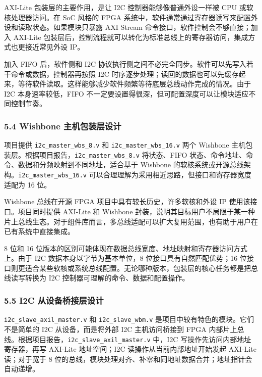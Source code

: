 AXI-Lite 包装层的主要作用，是让 I2C 控制器能够像普通外设一样被 CPU 或软核处理器访问。在 SoC 风格的 FPGA 系统中，软件通常通过寄存器读写来配置外设和读取状态。如果模块只暴露 AXI Stream 命令接口，软件控制会不够直接；加入 AXI-Lite 包装层后，控制流程就可以转化为标准总线上的寄存器访问，集成方式也更接近常见外设 IP。

加入 FIFO 后，软件侧和 I2C 协议执行侧之间不必完全同步。软件可以先写入若干命令或数据，控制器再按照 I2C 时序逐步处理；读回的数据也可以先缓存起来，等待软件读取。这样能够减少软件频繁等待底层总线动作完成的情况。由于 I2C 本身速率较低，FIFO 不一定要设置得很深，但可配置深度可以让模块适应不同控制节奏。

\subsubsection{5.4 Wishbone 主机包装层设计}\label{wishbone-ux4e3bux673aux5305ux88c5ux5c42ux8bbeux8ba1}

项目提供 \texttt{i2c\_master\_wbs\_8.v} 和 \texttt{i2c\_master\_wbs\_16.v} 两个 Wishbone 主机包装层。根据项目报告，\texttt{i2c\_master\_wbs\_8.v} 将状态、FIFO 状态、命令地址、命令、数据和分频映射到不同地址，适合基于 Wishbone 的软核系统或开源总线架构。\texttt{i2c\_master\_wbs\_16.v} 可以合理理解为采用相近思路，但接口和寄存器宽度适配为 16 位。

Wishbone 总线在开源 FPGA 项目中具有较长历史，许多软核和外设 IP 使用该接口。项目同时提供 AXI-Lite 和 Wishbone 封装，说明其目标用户不局限于某一种片上总线生态。对于组件库而言，多总线适配可以扩大复用范围，也有助于用户在已有系统中直接集成。

8 位和 16 位版本的区别可能体现在数据总线宽度、地址映射和寄存器访问方式上。由于 I2C 数据本身以字节为基本单位，8 位接口具有自然匹配优势；16 位接口则更适合某些软核或系统总线配置。无论哪种版本，包装层的核心任务都是把总线读写转换为 I2C 控制器可理解的命令、数据和配置操作。

\subsubsection{5.5 I2C 从设备桥接层设计}\label{i2c-ux4eceux8bbeux5907ux6865ux63a5ux5c42ux8bbeux8ba1}

\texttt{i2c\_slave\_axil\_master.v} 和 \texttt{i2c\_slave\_wbm.v} 是项目中较有特色的模块。它们不是简单的 I2C 从设备，而是将外部 I2C 主机访问桥接到 FPGA 内部片上总线。根据项目报告，\texttt{i2c\_slave\_axil\_master.v} 中，I2C 写操作先访问内部地址寄存器，再写 AXI-Lite 地址空间；I2C 读操作从当前内部地址开始发起 AXI-Lite 读；对于宽于 8 位的总线，模块处理对齐、补零和同地址数据合并；地址指针会自动递增。

